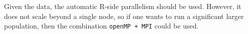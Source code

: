 Given the data, the automatic R-side parallelism should be
used. However, it does not scale beyond a single node, so if one wants
to run a significant larger population, then the combination \texttt{openMP
+ MPI} could be used.


